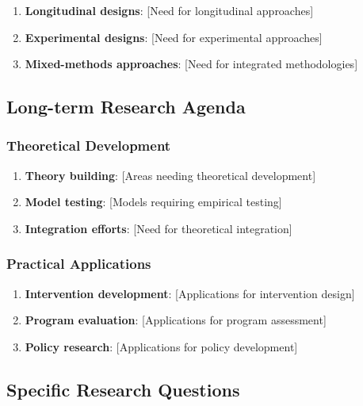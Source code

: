 \documentclass[
  12pt,
  letterpaper,
  12pt,
  letterpaper,
  oneside]{report}
\providecommand{\tightlist}{%
  \setlength{\itemsep}{0pt}\setlength{\parskip}{0pt}}
\begin{document}
\begin{enumerate}
\def\labelenumi{\arabic{enumi}.}
\tightlist
\item
  \textbf{Longitudinal designs}: {[}Need for longitudinal approaches{]}
\item
  \textbf{Experimental designs}: {[}Need for experimental approaches{]}
\item
  \textbf{Mixed-methods approaches}: {[}Need for integrated
  methodologies{]}
\end{enumerate}

\subsection{Long-term Research Agenda}\label{long-term-research-agenda}

\subsubsection{Theoretical Development}\label{theoretical-development}

\begin{enumerate}
\def\labelenumi{\arabic{enumi}.}
\tightlist
\item
  \textbf{Theory building}: {[}Areas needing theoretical development{]}
\item
  \textbf{Model testing}: {[}Models requiring empirical testing{]}
\item
  \textbf{Integration efforts}: {[}Need for theoretical integration{]}
\end{enumerate}

\subsubsection{Practical Applications}\label{practical-applications-1}

\begin{enumerate}
\def\labelenumi{\arabic{enumi}.}
\tightlist
\item
  \textbf{Intervention development}: {[}Applications for intervention
  design{]}
\item
  \textbf{Program evaluation}: {[}Applications for program assessment{]}
\item
  \textbf{Policy research}: {[}Applications for policy development{]}
\end{enumerate}

\subsection{Specific Research
Questions}\label{specific-research-questions}
\end{document}
